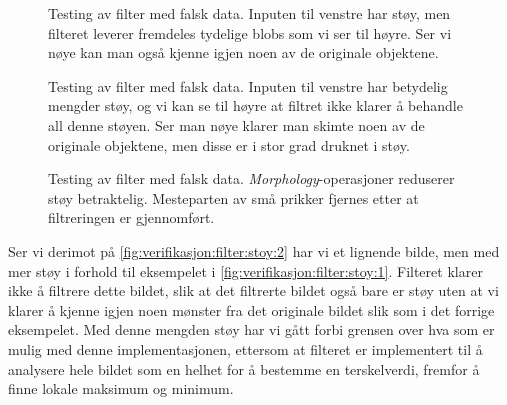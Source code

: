 \begin{figure}
    \centering
    \caption{Testing av filter med falsk data. Inputen til venstre har støy, men filteret leverer fremdeles tydelige blobs som vi ser til høyre. Ser vi nøye kan man også kjenne igjen noen av de originale objektene. }
    \label{fig:verifikasjon:filter:stoy:1}
    \vspace{0.5cm}
    
    \caption{Testing av filter med falsk data. Inputen til venstre har betydelig mengder støy, og vi kan se til høyre at filtret ikke klarer å behandle all denne støyen. Ser man nøye klarer man skimte noen av de originale objektene, men disse er i stor grad druknet i støy.}
    \label{fig:verifikasjon:filter:stoy:2}
    \vspace{0.5cm}
    
    \caption{Testing av filter med falsk data. \textit{Morphology}-operasjoner reduserer støy betraktelig. Mesteparten av små prikker fjernes etter at filtreringen er gjennomført.}
    \label{fig:verifikasjon:filter:stoy:3}
    \vspace{0.5cm}
\end{figure}

Ser vi derimot på \autoref{fig:verifikasjon:filter:stoy:2} har vi et lignende bilde, men med mer støy i forhold til eksempelet i \autoref{fig:verifikasjon:filter:stoy:1}. 
Filteret klarer ikke å filtrere dette bildet, slik at det filtrerte bildet også bare er støy uten at vi klarer å kjenne igjen noen mønster fra det originale bildet slik som i det forrige eksempelet. 
Med denne mengden støy har vi gått forbi grensen over hva som er mulig med denne implementasjonen, ettersom at filteret er implementert til å analysere hele bildet som en helhet for å bestemme en terskelverdi, fremfor å finne lokale maksimum og minimum.

